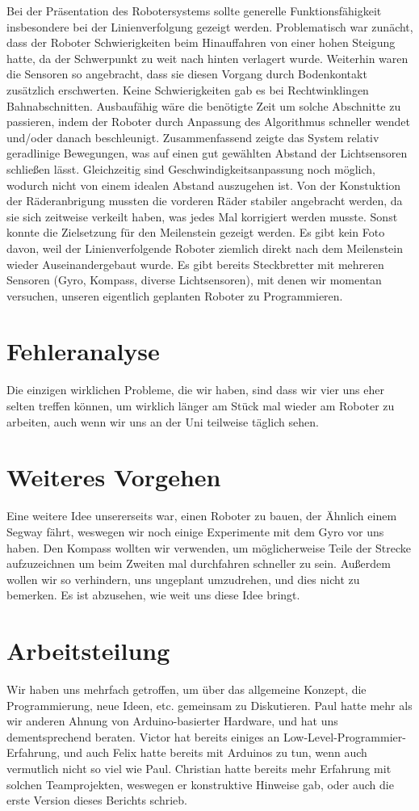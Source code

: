 \documentclass[11pt,a4paper]{article}
\begin{document}
Bei der Präsentation des Robotersystems sollte generelle Funktionsfähigkeit insbesondere bei der
Linienverfolgung gezeigt werden. Problematisch war zunächt, dass der Roboter Schwierigkeiten beim
Hinauffahren von einer hohen Steigung hatte, da der Schwerpunkt zu weit nach hinten verlagert 
wurde. Weiterhin waren die Sensoren so angebracht, dass sie diesen Vorgang durch Bodenkontakt 
zusätzlich erschwerten. Keine Schwierigkeiten gab es bei Rechtwinklingen Bahnabschnitten. 
Ausbaufähig wäre die benötigte Zeit um solche Abschnitte zu passieren, indem der Roboter durch 
Anpassung des Algorithmus schneller wendet und/oder danach beschleunigt. Zusammenfassend zeigte 
das System relativ geradlinige Bewegungen, was auf einen gut gewählten Abstand der Lichtsensoren
schließen lässt. Gleichzeitig sind Geschwindigkeitsanpassung noch möglich, wodurch nicht von einem 
idealen Abstand auszugehen ist. Von der Konstuktion der Räderanbrigung mussten die vorderen Räder 
stabiler angebracht werden, da sie sich zeitweise verkeilt haben, was jedes Mal korrigiert werden
musste. Sonst konnte die Zielsetzung für den Meilenstein gezeigt werden. Es gibt kein Foto davon,
weil der Linienverfolgende Roboter ziemlich direkt nach dem Meilenstein wieder Auseinandergebaut
wurde. Es gibt bereits Steckbretter mit mehreren Sensoren (Gyro, Kompass, diverse Lichtsensoren),
mit denen wir momentan versuchen, unseren eigentlich geplanten Roboter zu Programmieren.

\section{Fehleranalyse}
Die einzigen wirklichen Probleme, die wir haben, sind dass wir vier uns eher selten treffen können,
um wirklich länger am Stück mal wieder am Roboter zu arbeiten, auch wenn wir uns an der Uni
teilweise täglich sehen.

\section{Weiteres Vorgehen}

Eine weitere Idee unsererseits war, einen Roboter zu bauen, der Ähnlich einem Segway fährt,
weswegen wir noch einige Experimente mit dem Gyro vor uns haben. Den Kompass wollten wir verwenden,
um möglicherweise Teile der Strecke aufzuzeichnen um beim Zweiten mal durchfahren schneller zu sein.
Außerdem wollen wir so verhindern, uns ungeplant umzudrehen, und dies nicht zu bemerken.
Es ist abzusehen, wie weit uns diese Idee bringt.

\section{Arbeitsteilung}
Wir haben uns mehrfach getroffen, um über das allgemeine Konzept, die Programmierung, neue Ideen,
etc. gemeinsam zu Diskutieren. Paul hatte mehr als wir anderen Ahnung von Arduino-basierter 
Hardware, und hat uns dementsprechend beraten. Victor hat bereits einiges an 
Low-Level-Programmier-Erfahrung, und auch Felix hatte bereits mit Arduinos zu tun, wenn auch 
vermutlich nicht so viel wie Paul. Christian hatte bereits mehr Erfahrung mit solchen 
Teamprojekten, weswegen er konstruktive Hinweise gab, oder auch die erste Version dieses 
Berichts schrieb.
\end{document}
